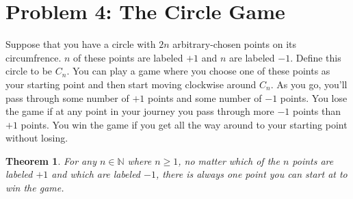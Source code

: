 \documentclass[10pt,letter]{article}
\newtheorem{nthm}{Theorem}
\begin{document}
\section*{Problem 4: The Circle Game}
Suppose that you have a circle with $2n$ arbitrary-chosen points on its circumfrence. $n$ of these points are labeled $+1$ and $n$ are labeled $-1$. Define this circle to be $C_n$. You can play a game where you choose one of these points as your starting point and then start moving clockwise around $C_n$. As you go, you'll pass through some number of $+1$ points and some number of $-1$ points. You lose the game if at any point in your journey you pass through more $-1$ points than $+1$ points. You win the game if you get all the way around to your starting point without losing.\\
\begin{nthm} \label{thm:circlethm}
  For any $n \in \mathbb{N}$ where $n \ge 1$, no matter which of the $n$ points are labeled $+1$ and which are labeled $-1$, there is always one point you can start at to win the game.
\end{nthm}
\end{document}

